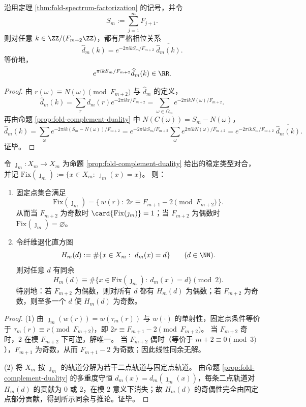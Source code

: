 \begin{corollary}\label{cor:fold-fourier-phase-locking-by-complement}
沿用定理 \ref{thm:fold-spectrum-factorization} 的记号，并令
\[
S_m:=\sum_{j=1}^m F_{j+1}.
\]
则对任意 \(k\in\ZZ/(F_{m+2}\ZZ)\)，都有严格相位关系
\[
\widehat d_m(k)=e^{-2\pi i kS_m/F_{m+2}}\ \overline{\widehat d_m(k)}.
\]
等价地，
\[
e^{\pi i kS_m/F_{m+2}}\widehat d_m(k)\in\RR.
\]
\end{corollary}
\begin{proof}
由 \(r(\omega)\equiv N(\omega)\pmod{F_{m+2}}\) 与 \(\widehat d_m\) 的定义，
\[
\widehat d_m(k)=\sum_{r} d_m(r)e^{-2\pi i kr/F_{m+2}}
=\sum_{\omega\in\Omega_m}e^{-2\pi i kN(\omega)/F_{m+2}}.
\]
再由命题 \ref{prop:fold-complement-duality} 中 \(N(C(\omega))=S_m-N(\omega)\)，
\[
\widehat d_m(k)
=\sum_{\omega}e^{-2\pi i k(S_m-N(\omega))/F_{m+2}}
=e^{-2\pi i kS_m/F_{m+2}}\sum_{\omega}e^{2\pi i kN(\omega)/F_{m+2}}
=e^{-2\pi i kS_m/F_{m+2}}\ \overline{\widehat d_m(k)}.
\]
证毕。
\end{proof}

\begin{proposition}[补对偶的固定点与退化直方图的偶性约束]\label{prop:fold-complement-duality-fixedpoints-parity}
令 \(\jmath_m:X_m\to X_m\) 为命题 \ref{prop:fold-complement-duality} 给出的稳定类型对合，并记
\(
\mathrm{Fix}(\jmath_m):=\{x\in X_m:\ \jmath_m(x)=x\}
\)。
则：
\begin{enumerate}
\normalfont
  \item 固定点集合满足
  \[
  \mathrm{Fix}(\jmath_m)=\{\,w(r):\ 2r\equiv F_{m+1}-2\pmod{F_{m+2}}\,\}.
  \]
  从而当 \(F_{m+2}\) 为奇数时 \(\card{\mathrm{Fix}(\jmath_m)}=1\)；当 \(F_{m+2}\) 为偶数时 \(\mathrm{Fix}(\jmath_m)=\varnothing\)。
  \item 令纤维退化直方图
  \[
  H_m(d):=\#\{x\in X_m:\ d_m(x)=d\}\qquad(d\in\NN).
  \]
  则对任意 \(d\) 有同余
  \[
  H_m(d)\equiv \#\{x\in \mathrm{Fix}(\jmath_m):\ d_m(x)=d\}\pmod 2.
  \]
  特别地：若 \(F_{m+2}\) 为偶数，则对所有 \(d\) 都有 \(H_m(d)\) 为偶数；若 \(F_{m+2}\) 为奇数，则至多一个 \(d\) 使 \(H_m(d)\) 为奇数。
\end{enumerate}
\end{proposition}
\begin{proof}
(1) 由 \(\jmath_m(w(r))=w(\tau_m(r))\) 与 \(w(\cdot)\) 的单射性，固定点条件等价于 \(\tau_m(r)\equiv r\pmod{F_{m+2}}\)，即 \(2r\equiv F_{m+1}-2\pmod{F_{m+2}}\)。
当 \(F_{m+2}\) 奇时，\(2\) 在模 \(F_{m+2}\) 下可逆，解唯一。
当 \(F_{m+2}\) 偶时（等价于 \(m+2\equiv 0\pmod 3\)），\(F_{m+1}\) 为奇数，从而 \(F_{m+1}-2\) 为奇数；因此线性同余无解。
\par
(2) 将 \(X_m\) 按 \(\jmath_m\) 的轨道分解为若干二点轨道与固定点轨道。
由命题 \ref{prop:fold-complement-duality} 的多重度守恒 \(d_m(x)=d_m(\jmath_m(x))\)，每条二点轨道对 \(H_m(d)\) 的贡献为 \(0\) 或 \(2\)，在模 \(2\) 意义下消失；故 \(H_m(d)\) 的奇偶性完全由固定点部分贡献，得到所示同余与推论。证毕。
\end{proof}

